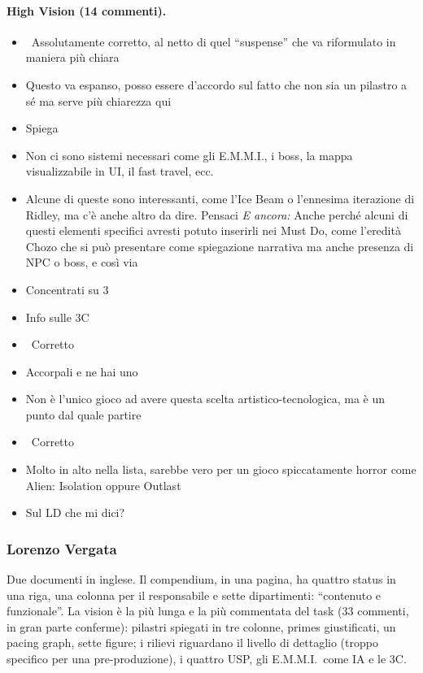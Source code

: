\paragraph{High Vision (14 commenti).}
{\small
\begin{itemize}
  \item {} \rvBene\ Assolutamente corretto, al netto di quel ``suspense'' che va riformulato in maniera più chiara
  \item {} Questo va espanso, posso essere d'accordo sul fatto che non sia un pilastro a sé ma serve più chiarezza qui
  \item {} Spiega
  \item {} Non ci sono sistemi necessari come gli E.M.M.I., i boss, la mappa visualizzabile in UI, il fast travel, ecc.
  \item {} Alcune di queste sono interessanti, come l'Ice Beam o l'ennesima iterazione di Ridley, ma c'è anche altro da dire. Pensaci \emph{E ancora:} Anche perché alcuni di questi elementi specifici avresti potuto inserirli nei Must Do, come l'eredità Chozo che si può presentare come spiegazione narrativa ma anche presenza di NPC o boss, e così via
  \item {} Concentrati su 3
  \item {} Info sulle 3C
  \item {} \rvBene\ Corretto
  \item {} Accorpali e ne hai uno
  \item {} Non è l'unico gioco ad avere questa scelta artistico-tecnologica, ma è un punto dal quale partire
  \item {} \rvBene\ Corretto
  \item {} Molto in alto nella lista, sarebbe vero per un gioco spiccatamente horror come Alien: Isolation oppure Outlast
  \item {} Sul LD che mi dici?
\end{itemize}
}

\subsubsection{Lorenzo Vergata}
Due documenti in inglese. Il compendium, in una pagina, ha quattro status in una riga, una colonna per il responsabile e sette dipartimenti: ``contenuto e funzionale''. La vision è la più lunga e la più commentata del task (33 commenti, in gran parte conferme): pilastri spiegati in tre colonne, primes giustificati, un pacing graph, sette figure; i rilievi riguardano il livello di dettaglio (troppo specifico per una pre-produzione), i quattro USP, gli E.M.M.I.\ come IA e le 3C.

